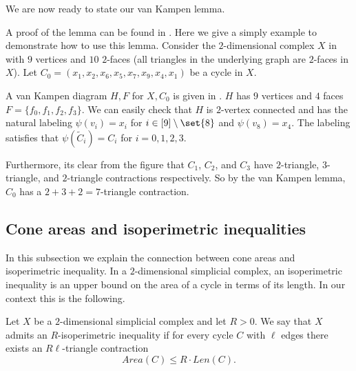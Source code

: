 We are now ready to state our van Kampen lemma.
\begin{lemma}
\end{lemma}

A proof of the lemma can be found in . Here we give a simply example to demonstrate how to use this lemma. 
Consider the $2$-dimensional complex $X$ in  with $9$ vertices and $10$ $2$-faces (all triangles in the underlying graph are $2$-faces in $X$). Let $C_0 = (x_1,x_2,x_6,x_5,x_7,x_9,x_4,x_1)$ be a cycle in $X$. 

A van Kampen diagram $H,F$ for $X,C_0$ is given in . $H$ has $9$ vertices and $4$ faces $F = \{f_0,f_1,f_2,f_3\}$. We can easily check that $H$ is $2$-vertex connected and has the natural labeling $\psi(v_i) = x_i$ for $i\in [9]\setminus \set{8}$ and $\psi(v_8) = x_4$. The labeling satisfies that $\psi(\tilde{C}_i) = C_i$ for $i = 0,1,2,3$. 

Furthermore, its clear from the figure that $C_1$, $C_2$, and $C_3$ have $2$-triangle, $3$-triangle, and $2$-triangle contractions respectively. So by the van Kampen lemma, $C_0$ has a $2+3+2 = 7$-triangle contraction.  





\subsection{Cone areas and isoperimetric inequalities} \label{sec:cones-and-area}
In this subsection we explain the connection between cone areas and isoperimetric inequality. In a \(2\)-dimensional simplicial complex, an isoperimetric inequality is an upper bound on the area of a cycle in terms of its length.
 In our context this is the following.
\begin{definition}
    Let \(X\) be a \(2\)-dimensional simplicial complex and let \(R > 0\). We say that \(X\) admits an \(R\)-isoperimetric inequality if for every cycle \(C\) with \(\ell\) edges there exists an \(R\ell\)-triangle contraction 
    \[Area(C) \le R\cdot Len(C) .\]
\end{definition}

